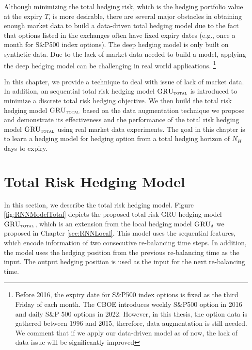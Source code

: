 \documentclass[letterpaper,12pt,titlepage,oneside,final]{book}
\numberwithin{equation}{section}
\theoremstyle{definition}
\newcommand{\model}{\textsc{GRU}_\delta}
\newcommand{\modelT}{\textsc{GRU}_{\textsc{total}}}
\begin{document}
Although minimizing the total hedging risk, which is  the hedging portfolio value at the expiry $T$, is more desirable, there are several major obstacles in obtaining enough market data to build a data-driven total hedging model due to the fact that options listed in the exchanges often have fixed expiry dates (e.g., once a month for S\&P500 index options). The deep hedging model \citep{buehler2019deep} is only built on synthetic data. Due to the lack of market data needed to build a  model, applying the  deep hedging model \citep{buehler2019deep} can be challenging in real world applications. \footnote{Before 2016, the expiry date for S\&P500 index options is fixed as the third Friday of each month. The CBOE introduces weekly S\&P500 option in  2016 and daily S\&P 500 options in 2022. However, in this thesis, the option data is gathered between 1996 and 2015, therefore, data augmentation is still needed. We comment that if we apply our data-driven model as of now, the lack of data issue will be significantly improved}

In this chapter, we  provide a technique to deal with issue of lack of market data. In addition, an   sequential total risk hedging model $\modelT$ is introduced to minimize a discrete total risk hedging objective. We then build the total risk hedging model $\modelT$ based on the data augmentation technique we propose and demonstrate its effectiveness  and the performance of  the  total risk hedging model $\modelT$ using real market data experiments.  The goal in this chapter is to learn a hedging model for hedging option from a total hedging horizon of $N_H$ days to expiry. 


\section{Total Risk Hedging Model}
\label{sec:TotalModelDes}
In this section, we describe the total risk hedging model.
Figure \ref{fig:RNNModelTotal} depicts the proposed total risk GRU  hedging  model $\modelT$,
which is an extension from the local hedging model $\model$ we proposed in Chapter \ref{sec:RNNLocal}.
This model uses the sequential features, which encode information of two consecutive re-balancing time steps. In addition, the model uses the hedging position from the previous re-balancing time as the input. The output hedging position is used as the input for the next re-balancing time.
\end{document}
